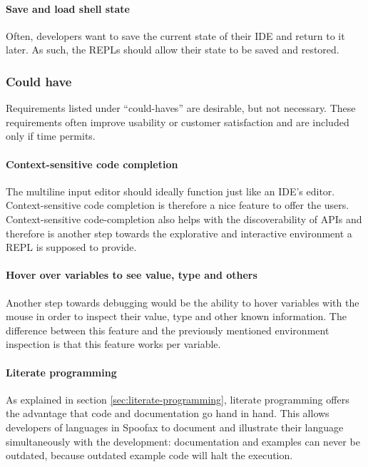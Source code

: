 \paragraph{Save and load shell state} Often, developers want to save the current
state of their IDE and return to it later. As such, the REPLs should allow their
state to be saved and restored.

\subsubsection{Could have}

Requirements listed under ``could-haves'' are desirable, but not necessary.
These requirements often improve usability or customer satisfaction and are
included only if time permits.

\paragraph{Context-sensitive code completion} The multiline input editor should
ideally function just like an IDE's editor. Context-sensitive code completion is
therefore a nice feature to offer the users. Context-sensitive code-completion
also helps with the discoverability of APIs and therefore is another step
towards the explorative and interactive environment a REPL is supposed to
provide.

\paragraph{Hover over variables to see value, type and others} Another step
towards debugging would be the ability to hover variables with the mouse in
order to inspect their value, type and other known information. The difference
between this feature and the previously mentioned environment inspection is that
this feature works per variable.

\paragraph{Literate programming} As explained in section
\cref{sec:literate-programming}, literate programming offers the advantage that
code and documentation go hand in hand. This allows developers of languages in
Spoofax to document and illustrate their language simultaneously with the
development: documentation and examples can never be outdated, because outdated
example code will halt the execution.

